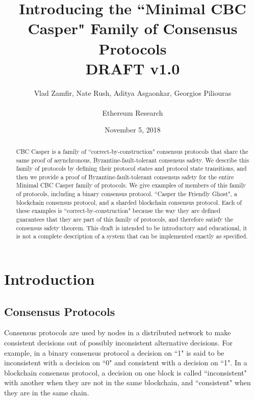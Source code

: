 \documentclass{article}
\theoremstyle{definition}
\begin{document}
\title{Introducing the ``Minimal CBC Casper" Family of Consensus Protocols  \\ \vspace{5mm} \small{DRAFT v1.0}}
\author{Vlad Zamfir, Nate Rush, Aditya Asgaonkar, Georgios Piliouras \\ \\ Ethereum Research}
\date{November 5, 2018}
\maketitle

\begin{abstract}
CBC Casper is a family of ``correct-by-construction" consensus protocols that share the same proof of asynchronous, Byzantine-fault-tolerant consensus safety. We describe this family of protocols by defining their protocol states and protocol state transitions, and then we provide a proof of Byzantine-fault-tolerant consensus safety for the entire Minimal CBC Casper family of protocols. We give examples of members of this family of protocols, including a binary consensus protocol. ``Casper the Friendly Ghost", a blockchain consensus protocol, and a sharded blockchain consensus protocol. Each of these examples is ``correct-by-construction" because the way they are defined guarantees that they are part of this family of protocols, and therefore satisfy the consensus safety theorem. This draft is intended to be introductory and educational, it is not a complete description of a system that can be implemented exactly as specified.
\end{abstract}

\pagebreak
\tableofcontents

\pagebreak
\section{Introduction}

\subsection{Consensus Protocols}

Consensus protocols are used by nodes in a distributed network to make consistent decisions out of possibly inconsistent alternative decisions. For example, in a binary consensus protocol a decision on ``1" is said to be inconsistent with a decision on ``0" and consistent with a decision on ``1". In a blockchain consensus protocol, a decision on one block is called ``inconsistent" with another when they are not in the same blockchain, and ``consistent" when they are in the same chain.
\end{document}

